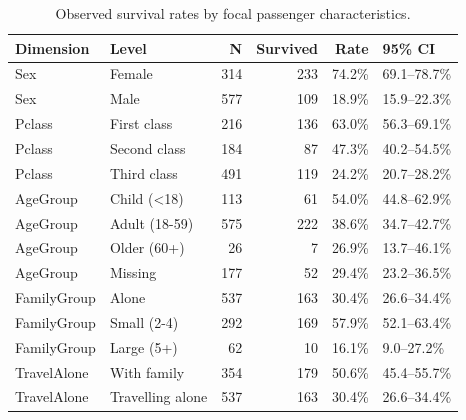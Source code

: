\begin{table}[htbp]
\centering
\caption{Observed survival rates by focal passenger characteristics.}
\label{tab:group-rates}
\small
\begin{tabular}{llrrrl}
\toprule
Dimension & Level & N & Survived & Rate & 95\% CI \\
\midrule
Sex & Female & 314 & 233 & 74.2\% & 69.1--78.7\% \\
Sex & Male & 577 & 109 & 18.9\% & 15.9--22.3\% \\
Pclass & First class & 216 & 136 & 63.0\% & 56.3--69.1\% \\
Pclass & Second class & 184 & 87 & 47.3\% & 40.2--54.5\% \\
Pclass & Third class & 491 & 119 & 24.2\% & 20.7--28.2\% \\
AgeGroup & Child (<18) & 113 & 61 & 54.0\% & 44.8--62.9\% \\
AgeGroup & Adult (18-59) & 575 & 222 & 38.6\% & 34.7--42.7\% \\
AgeGroup & Older (60+) & 26 & 7 & 26.9\% & 13.7--46.1\% \\
AgeGroup & Missing & 177 & 52 & 29.4\% & 23.2--36.5\% \\
FamilyGroup & Alone & 537 & 163 & 30.4\% & 26.6--34.4\% \\
FamilyGroup & Small (2-4) & 292 & 169 & 57.9\% & 52.1--63.4\% \\
FamilyGroup & Large (5+) & 62 & 10 & 16.1\% & 9.0--27.2\% \\
TravelAlone & With family & 354 & 179 & 50.6\% & 45.4--55.7\% \\
TravelAlone & Travelling alone & 537 & 163 & 30.4\% & 26.6--34.4\% \\
\bottomrule
\end{tabular}
\end{table}
